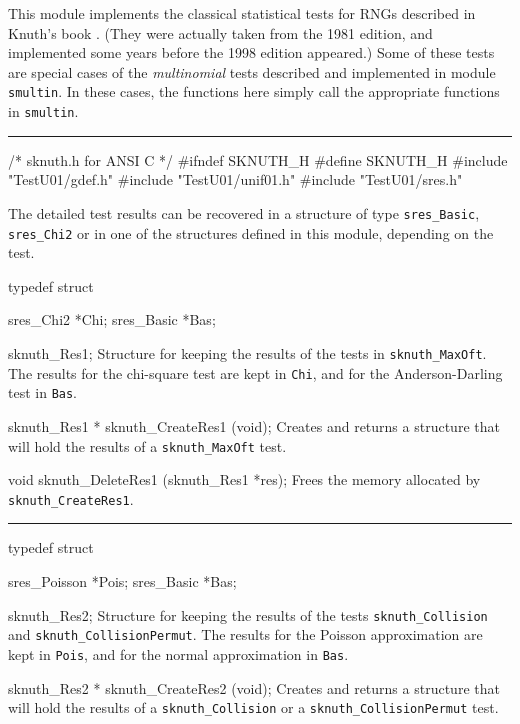 
This module implements the classical statistical tests for RNGs
described in Knuth's book \cite{rKNU81a}.
(They were actually taken from the 1981 edition, and implemented
some years before the 1998 edition \cite{rKNU98a} appeared.)
Some of these tests are special cases of the {\em multinomial\/}
tests described and implemented in module {\tt smultin}.
In these cases, the functions here simply call the appropriate
functions in {\tt smultin}.
\resdef

\bigskip\hrule

\code\hide
/* sknuth.h  for ANSI C */
#ifndef SKNUTH_H
#define SKNUTH_H
\endhide
#include "TestU01/gdef.h"
#include "TestU01/unif01.h"
#include "TestU01/sres.h"
\endcode


\ifdetailed  %


The detailed test results can be recovered in a structure of type
{\tt sres\_Basic}, {\tt sres\_Chi2} or in one of the structures
defined in this module, depending on the test.

\code

typedef struct {

   sres_Chi2 *Chi;
   sres_Basic *Bas;

} sknuth_Res1;
\endcode
 \tab
  Structure for keeping the results of the tests in {\tt sknuth\_MaxOft}.
  The results for the chi-square test are kept in
  {\tt Chi}, and for the Anderson-Darling test in  {\tt Bas}.
 \endtab
\code


sknuth_Res1 * sknuth_CreateRes1 (void);
\endcode
 \tab
  Creates and returns a structure that will hold the results
  of a  {\tt sknuth\_MaxOft} test.
 \endtab
\code


void sknuth_DeleteRes1 (sknuth_Res1 *res);
\endcode
 \tab
  Frees the memory allocated by {\tt sknuth\_CreateRes1}.
 \endtab

\bigskip\hrule\bigskip

\code
typedef struct {

   sres_Poisson *Pois;
   sres_Basic *Bas;

} sknuth_Res2;
\endcode
 \tab
  Structure for keeping the results of the tests {\tt sknuth\_Collision}
  and {\tt sknuth\_CollisionPermut}.
  The results for the Poisson approximation are kept in
  {\tt Pois}, and for the normal approximation in  {\tt Bas}.
 \endtab
\code


sknuth_Res2 * sknuth_CreateRes2 (void);
\endcode
 \tab
  Creates and returns a structure that will hold the results
  of a  {\tt sknuth\_Collision} or a {\tt sknuth\_CollisionPermut} test.
 \endtab
\code


